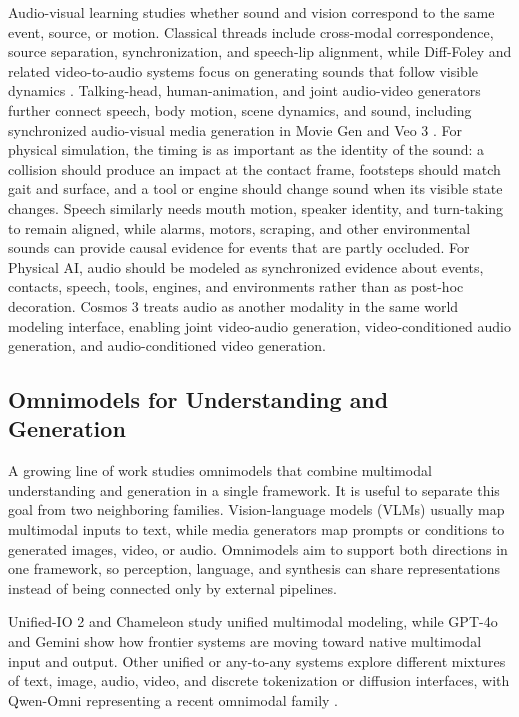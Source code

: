 \documentclass{llmxive}
\begin{document}
Audio-visual learning studies whether sound and vision correspond to the same event, source, or motion.
Classical threads include cross-modal correspondence, source separation, synchronization, and speech-lip alignment, while Diff-Foley \citep{luo2023difffoley} and related video-to-audio systems focus on generating sounds that follow visible dynamics \citep{owens2018audiovisual,zhao2018sound,ephrat2018looking,chung2016out,prajwal2020wav2lip,comunita2023syncfusion,zhang2024foleycrafter,ren2024stav2a,gramaccioni2024stablev2a,mmaudio,klingfoley}.
Talking-head, human-animation, and joint audio-video generators further connect speech, body motion, scene dynamics, and sound, including synchronized audio-visual media generation in Movie Gen \citep{polyak2024movie} and Veo 3 \citep{veo3,vasa1,emo,hallo,omnihuman,xing2024seeing,ruan2022mmdiffusion,wang2024avdit,liu2024syncflow,li2025threemdit,hacohen2026ltx2,liu2025javisditt}.
For physical simulation, the timing is as important as the identity of the sound: a collision should produce an impact at the contact frame, footsteps should match gait and surface, and a tool or engine should change sound when its visible state changes.
Speech similarly needs mouth motion, speaker identity, and turn-taking to remain aligned, while alarms, motors, scraping, and other environmental sounds can provide causal evidence for events that are partly occluded.
For Physical AI, audio should be modeled as synchronized evidence about events, contacts, speech, tools, engines, and environments rather than as post-hoc decoration.
Cosmos 3 treats audio as another modality in the same world modeling interface, enabling joint video-audio generation, video-conditioned audio generation, and audio-conditioned video generation.

\subsection{Omnimodels for Understanding and Generation}
A growing line of work studies omnimodels that combine multimodal understanding and generation in a single framework.
It is useful to separate this goal from two neighboring families.
Vision-language models (VLMs) usually map multimodal inputs to text, while media generators map prompts or conditions to generated images, video, or audio.
Omnimodels aim to support both directions in one framework, so perception, language, and synthesis can share representations instead of being connected only by external pipelines.

Unified-IO 2 \citep{lu2023unifiedio2} and Chameleon \citep{chameleon2024} study unified multimodal modeling, while GPT-4o \citep{openai2024gpt4o} and Gemini \citep{gemini2,gemini3} show how frontier systems are moving toward native multimodal input and output.
Other unified or any-to-any systems explore different mixtures of text, image, audio, video, and discrete tokenization or diffusion interfaces, with Qwen-Omni \citep{xu2025qwen3omni,qwen35omni} representing a recent omnimodal family \citep{tang2023codi,wu2023nextgpt,anygpt,seedx,fourm,xie2024showo,chen2025januspro,emu3}.
\end{document}
